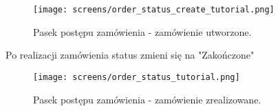 \documentclass[12pt,a4paper,oneside]{article}
\theoremstyle{definition}
\numberwithin{equation}{section}
\begin{document}
\begin{figure}[H]
    \centering
    \texttt{[image: screens/order\_status\_create\_tutorial.png]}
    \caption{Pasek postępu zamówienia - zamówienie utworzone.}
    \label{fig:order_status_create_tutorial}
\end{figure}
\newpage
Po realizacji zamówienia status zmieni się na "Zakończone"

\begin{figure}[H]
    \centering
    \texttt{[image: screens/order\_status\_tutorial.png]}
    \caption{Pasek postępu zamówienia - zamówienie zrealizowane.}
    \label{fig:order_status_tutorial}
\end{figure}




\renewcommand\refname{Literatura (jeżeli wymagana)}
%
%
%
%
\end{document}
